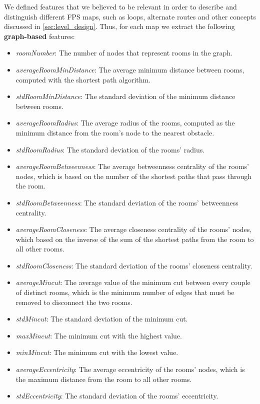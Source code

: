 \documentclass{Configuration_Files/PoliMi3i_thesis}
\begin{document}
We defined features that we believed to be relevant in order to describe and distinguish different FPS maps, such as loops, alternate routes and other concepts discussed in \ref{sec:level_design}.
Thus, for each map we extract the following \textbf{graph-based} features:

\begin{itemize}
    \item \textit{roomNumber}: The number of nodes that represent rooms in the graph.
    \item \textit{averageRoomMinDistance}: The average minimum distance between rooms, computed with the shortest path algorithm.
    \item \textit{stdRoomMinDistance}: The standard deviation of the minimum distance between rooms.
    \item \textit{averageRoomRadius}: The average radius of the rooms, computed as the minimum distance from the room's node to the nearest obstacle.
    \item \textit{stdRoomRadius}: The standard deviation of the rooms' radius.
    \item \textit{averageRoomBetweenness}: The average betweenness centrality of the rooms' nodes, which is based on the number of the shortest paths that pass through the room.
    \item \textit{stdRoomBetweenness}: The standard deviation of the rooms' betweenness centrality.
    \item \textit{averageRoomCloseness}: The average closeness centrality of the rooms' nodes, which based on the inverse of the sum of the shortest paths from the room to all other rooms.
    \item \textit{stdRoomCloseness}: The standard deviation of the rooms' closeness centrality.
    \item \textit{averageMincut}: The average value of the minimum cut between every couple of distinct rooms, which is the minimum number of edges that must be removed to disconnect the two rooms. 
    \item \textit{stdMincut}: The standard deviation of the minimum cut.
    \item \textit{maxMincut}: The minimum cut with the highest value.
    \item \textit{minMincut}: The minimum cut with the lowest value.
    \item \textit{averageEccentricity}: The average eccentricity of the rooms' nodes, which is the maximum distance from the room to all other rooms.
    \item \textit{stdEccentricity}: The standard deviation of the rooms' eccentricity.

\end{itemize}
\end{document}

